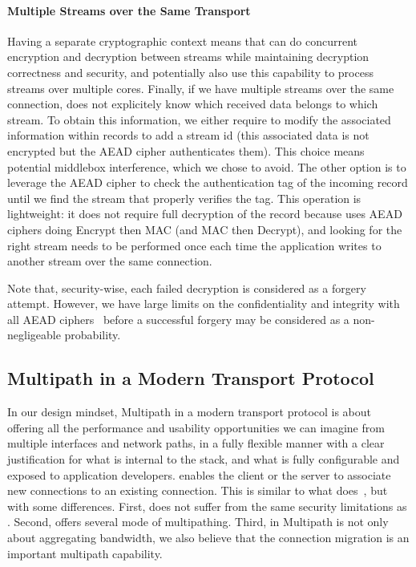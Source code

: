 \paragraph*{Multiple Streams over the Same Transport}
Having a separate cryptographic context means that \tcpls can do concurrent
encryption and decryption between streams while maintaining decryption
correctness and security, and potentially also use this capability to process
streams over multiple cores. Finally, if we have multiple streams over the same
\tcp connection, \tcpls does not explicitely know which received data belongs to
which stream. To obtain this information, we either require to modify the
associated information within \tls records to add a stream id (this associated
data is not encrypted but the AEAD cipher authenticates them). This choice
means potential middlebox interference, which we chose to avoid. The other
option is to leverage the AEAD cipher to check the authentication tag of the
incoming record until we find the stream that properly verifies the tag. This
operation is lightweight: it does not require full decryption of the record
because  uses AEAD ciphers doing Encrypt then MAC (and MAC then
Decrypt), and looking for the right stream needs to be performed once each time
the application writes to another stream over the same \tcp connection.

Note that, security-wise, each failed decryption is considered as a
forgery attempt. However, we have large limits on the confidentiality and
integrity with all AEAD ciphers~\cite{luykx2015limits, aeadlimits} before a
successful forgery may be considered as a non-negligeable probability.



\subsection{Multipath in a Modern Transport Protocol}
\label{sec:multipath}

In our design mindset, Multipath in a modern transport protocol is about
offering all the performance and usability opportunities we can imagine from
multiple interfaces and network paths, in a fully flexible manner with a clear
justification for what is internal to the stack, and what is fully configurable
and exposed to application developers. 
\tcpls enables the client or the server to associate new \tcp connections to an
existing \tcpls connection. This is similar to what \mptcp
does~\cite{raiciu2012hard,rfc6824}, but with some differences. First, \tcpls
does not suffer from the same security limitations as \mptcp. 
Second, \tcpls offers several mode of multipathing.
Third, in \tcpls Multipath is not only about aggregating bandwidth, we also
believe that the connection migration is an important multipath capability.

